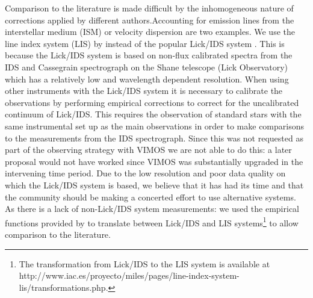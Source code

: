 	Comparison to the literature is made difficult by the inhomogeneous nature of corrections applied by different authors.Accounting for emission lines from the interstellar medium (ISM) or velocity dispersion are two examples. We use the line index system (LIS) by \citet{Vazdekis2010} instead of the popular Lick/IDS system \citep{Faber1985, Worthey1994}. This is because the Lick/IDS system is based on non-flux calibrated spectra from the IDS and Cassegrain spectrograph on the Shane telescope (Lick Observatory) which has a relatively low and wavelength dependent resolution. When using other instruments with the Lick/IDS system it is necessary to calibrate the observations by performing empirical corrections to correct for the uncalibrated continuum of Lick/IDS. This requires the observation of standard stars with the same instrumental set up as the main observations in order to make comparisons to the measurements from the IDS spectrograph. Since this was not requested as part of the observing strategy with VIMOS we are not able to do this: a later proposal would not have worked since VIMOS was substantially upgraded in the intervening time period. Due to the low resolution and poor data quality on which the Lick/IDS system is based, we believe that it has had its time and that the community should be making a concerted effort to use alternative systems. As there is a lack of non-Lick/IDS system measurements: we used the empirical functions provided by \citet{Vazdekis2010} to translate between Lick/IDS and LIS systems\footnote{The transformation from Lick/IDS to the LIS system is available at http://www.iac.es/proyecto/miles/pages/line-index-system-lis/transformations.php.} to allow comparison to the literature. 


